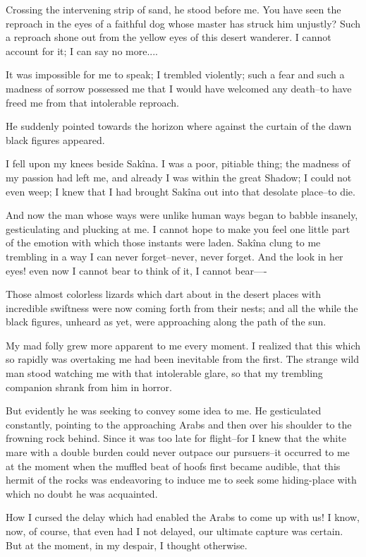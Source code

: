 Crossing the intervening strip of sand, he stood before me. You have
seen the reproach in the eyes of a faithful dog whose master has
struck him unjustly? Such a reproach shone out from the yellow eyes of
this desert wanderer. I cannot account for it; I can say no more....

It was impossible for me to speak; I trembled violently; such a fear
and such a madness of sorrow possessed me that I would have welcomed
any death--to have freed me from that intolerable reproach.

He suddenly pointed towards the horizon where against the curtain of
the dawn black figures appeared.

I fell upon my knees beside Sakîna. I was a poor, pitiable thing; the
madness of my passion had left me, and already I was within the great
Shadow; I could not even weep; I knew that I had brought Sakîna out
into that desolate place--to die.

And now the man whose ways were unlike human ways began to babble
insanely, gesticulating and plucking at me. I cannot hope to make you
feel one little part of the emotion with which those instants were
laden. Sakîna clung to me trembling in a way I can never
forget--never, never forget. And the look in her eyes! even now I
cannot bear to think of it, I cannot bear----

Those almost colorless lizards which dart about in the desert places
with incredible swiftness were now coming forth from their nests; and
all the while the black figures, unheard as yet, were approaching
along the path of the sun.

My mad folly grew more apparent to me every moment. I realized that
this which so rapidly was overtaking me had been inevitable from the
first. The strange wild man stood watching me with that intolerable
glare, so that my trembling companion shrank from him in horror.

But evidently he was seeking to convey some idea to me. He
gesticulated constantly, pointing to the approaching Arabs and then
over his shoulder to the frowning rock behind. Since it was too late
for flight--for I knew that the white mare with a double burden could
never outpace our pursuers--it occurred to me at the moment when the
muffled beat of hoofs first became audible, that this hermit of the
rocks was endeavoring to induce me to seek some hiding-place with
which no doubt he was acquainted.

How I cursed the delay which had enabled the Arabs to come up with us!
I know, now, of course, that even had I not delayed, our ultimate
capture was certain. But at the moment, in my despair, I thought
otherwise.

